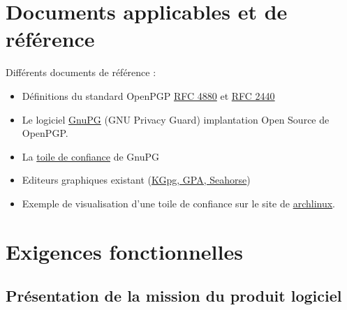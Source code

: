 \documentclass{../res/univ-projet}
\begin{document}
\section{Documents applicables et de référence}
Différents documents de référence :
\begin{itemize}
\item Définitions du standard OpenPGP \href{file:../../ressources/openPGP/rfc4880-en.pdf}{RFC 4880}
  et \href{file:../../ressources/openPGP/rfc2440-fr.pdf}{RFC 2440}
\item Le logiciel \href{https://www.gnupg.org/}{GnuPG} (GNU Privacy Guard) implantation Open Source
  de OpenPGP.
\item La \href{https://www.gnupg.org/gph/fr/manual.html#AEN541}{toile de confiance} de GnuPG
\item Editeurs graphiques existant 
  (\href{http://www.gnupg.org/related_software/frontends.en.html}{KGpg, GPA, Seahorse})
\item Exemple de visualisation d'une toile de confiance sur le site de 
  \href{https://www.archlinux.org/master-keys/#visualization}{archlinux}.
\end{itemize}


\section{Exigences fonctionnelles}
\subsection{Présentation de la mission du produit logiciel}
\end{document}
